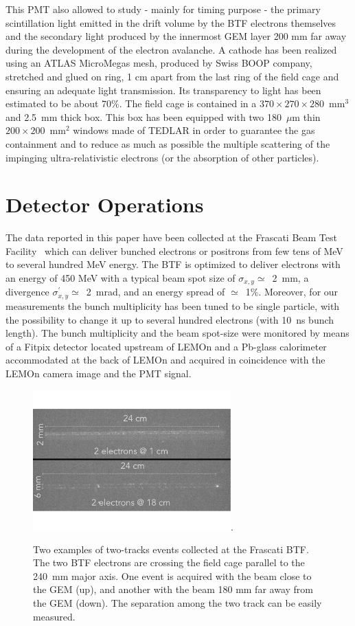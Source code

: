 \documentclass[%
 aip,
 amsmath,amssymb,
 reprint,%
]{revtex4-1}
\begin{document}
This PMT  also allowed to study - mainly for timing purpose -  the primary scintillation light emitted   in the drift volume by the BTF electrons themselves and the secondary light produced by the innermost GEM layer 200 mm far away during the development of the electron avalanche. A  cathode has been realized using an ATLAS MicroMegas mesh, produced
by Swiss BOOP company, stretched and glued on ring, 1 cm apart from the last ring of the field cage and ensuring an adequate light transmission. Its transparency to light has been estimated to be about $70\%$. The  field cage is contained in a  $370\times270\times280$~mm$^3$ and 2.5~mm thick box. This box has been equipped with two 180~$\mu$m thin $200\times200$~mm$^2$ windows made of TEDLAR in order to guarantee the gas containment and to reduce as much as possible the multiple scattering of the impinging ultra-relativistic  electrons (or the absorption of other particles).

\section{Detector Operations}

The data reported in this paper have been collected at the Frascati Beam Test Facility~\cite{bib:btf} which can deliver bunched electrons or positrons from few tens of MeV to several hundred MeV energy. The BTF is optimized to deliver electrons with an energy of 450 MeV with  a typical beam spot size of $\sigma_{x,y}\simeq$~2~mm, a divergence  $\sigma^\prime_{x,y}\simeq$~2~mrad, and an energy spread of $\simeq$~1\%. Moreover, for our measurements the bunch multiplicity has been tuned to be  single particle, with the possibility to change it up to several hundred  electrons (with 10~ns bunch length). The bunch multiplicity and the beam spot-size were monitored by means of a Fitpix \cite{Kraus_2011} detector located upstream of LEMOn  and a Pb-glass  calorimeter~\cite{Buonomo:2017sdz} ~\cite{Buonomo:2017btf} accommodated at the back of LEMOn and acquired in coincidence with  the LEMOn camera image and the  PMT signal. 

\begin{figure}[!ht]
\includegraphics[width=3in]{Fig3-tracks.pdf}\DeclareGraphicsExtensions.
\caption{Two examples of  two-tracks events collected at the Frascati BTF. The two BTF electrons are crossing the field cage parallel  to  the  240~mm major axis. One event is acquired with the beam   close to the GEM (up), and another with the beam 180 mm far away  from the GEM (down). The separation among the two track can be easily measured.}
\label{fig:track}
\end{figure}
\end{document}
